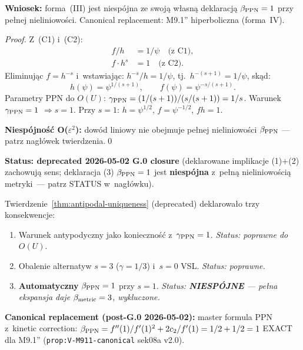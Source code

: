 \begin{theorem}
\textbf{Wniosek:} forma~(III) jest niespójna ze swoj\k{a} w\l{}asn\k{a}
deklaracj\k{a} $\beta_{\rm PPN}=1$ przy pe\l{}nej nieliniowo\'sci.
Canonical replacement: M9.1'' hiperboliczna (forma~IV).
\end{theorem}

\begin{proof}
Z~(C1) i~(C2):
\begin{align}
  f/h &= 1/\psi \quad\text{(z C1)}, \\
  f \cdot h^s &= 1 \quad\text{(z C2)}.
\end{align}
Eliminuj\k{a}c $f = h^{-s}$ i~wstawiaj\k{a}c:
$h^{-s}/h = 1/\psi$, tj.~$h^{-(s+1)} = 1/\psi$, sk\k{a}d:
\begin{equation}
  h(\psi) = \psi^{1/(s+1)},
  \qquad
  f(\psi) = \psi^{-s/(s+1)}.
\end{equation}
Parametry PPN do $O(U)$:
$\gamma_{\rm PPN} = (1/(s+1))/(s/(s+1)) = 1/s$.
Warunek $\gamma_{\rm PPN}=1$ $\Rightarrow s=1$.
Przy $s=1$: $h=\psi^{1/2}$, $f=\psi^{-1/2}$, $fh=1$.

\textbf{Niespójność O($\varepsilon^2$):} dow\'od liniowy nie obejmuje
pe\l{}nej nieliniowo\'sci $\beta_{\rm PPN}$ — patrz nag\l{}\'owek
twierdzenia.\qed
\end{proof}

\begin{remark}%
\label{rem:antipodal-implications}
\textbf{Status: deprecated 2026-05-02 G.0 closure} (deklarowane
implikacje (1)+(2) zachowuj\k{a} sens; deklaracja (3)
$\beta_{\rm PPN}=1$ jest \textbf{niespójna} z~pe\l{}n\k{a} nieliniowo\'sci\k{a}
metryki~--- patrz STATUS w~nag\l{}\'owku).

Twierdzenie~\ref{thm:antipodal-uniqueness} (deprecated) deklarowa\l{}o
trzy konsekwencje:
\begin{enumerate}[nosep]
  \item Warunek antypodyczny jako konieczno\'s\'c z~$\gamma_{\rm PPN}=1$.
    \emph{Status: poprawne do} $O(U)$.
  \item Obalenie alternatyw $s=3$ ($\gamma=1/3$) i~$s=0$ VSL.
    \emph{Status: poprawne.}
  \item \textbf{Automatyczny} $\beta_{\rm PPN}=1$ przy $s=1$.
    \emph{Status: \textbf{NIESP\'OJNE} — pe\l{}na ekspansja daje
    $\beta_{\rm metric}=3$, wykluczone.}
\end{enumerate}

\textbf{Canonical replacement (post-G.0 2026-05-02):} master formula
PPN z~kinetic correction:
$\beta_{\rm PPN} = f''(1)/f'(1)^2 + 2c_2/f'(1) = 1/2 + 1/2 = 1$ EXACT
dla M9.1'' (\texttt{prop:V-M911-canonical} sek08a v2.0).
\end{remark}

